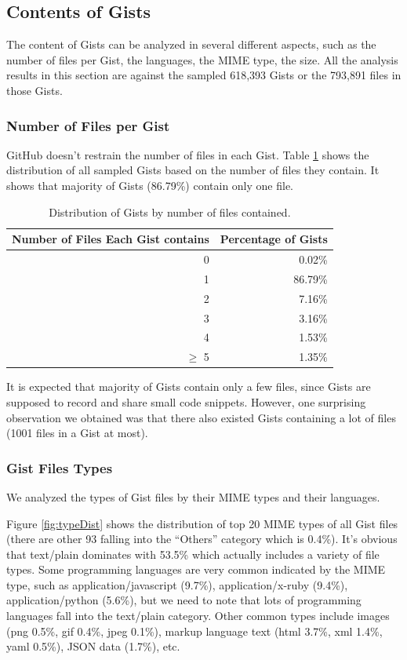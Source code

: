 \subsection{Contents of Gists}
The content of Gists can be analyzed in several different aspects, such as the number of files per Gist, the languages, the MIME type, the size. All the analysis results in this section are against the sampled 618,393 Gists or the 793,891 files in those Gists.

\subsubsection{Number of Files per Gist}

GitHub doesn't restrain the number of files in each Gist. Table \ref{tb:files} shows the distribution of all sampled Gists based on the number of files they contain. It shows that majority of Gists (86.79\%) contain only one file. 

\begin{table}[!htb]
 \begin{center}
 \begin{tabular}{@{}rr} 
    \textbf{Number of Files Each Gist contains}	&	\textbf{Percentage of Gists} \\ \hline
	0	&	0.02\%\\
	1	&	86.79\%\\
	2	&	7.16\%\\
	3	&	3.16\%\\
	4	&	1.53\%\\
	$\geq$ 5	&	1.35\%\\\hline
 \end{tabular}
 \end{center}
 \caption{Distribution of Gists by number of files contained.}
 \label{tb:files}
\end{table}

It is expected that majority of Gists contain only a few files, since Gists are supposed to record and share small code snippets. However, one surprising observation we obtained was that there also existed Gists containing a lot of files (1001 files in a Gist at most). 

\subsubsection{Gist Files Types}
We analyzed the types of Gist files by their MIME types and their languages.

Figure \ref{fig:typeDist} shows the distribution of top 20 MIME types of all Gist files (there are other 93 falling into the ``Others'' category which is 0.4\%). It's obvious that text/plain dominates with 53.5\% which actually includes a variety of file types. Some programming languages are very common indicated by the MIME type, such as application/javascript (9.7\%), application/x-ruby (9.4\%), application/python (5.6\%), but we need to note that lots of programming languages fall into the text/plain category. Other common types include images (png 0.5\%, gif 0.4\%, jpeg 0.1\%), markup language text (html 3.7\%, xml 1.4\%, yaml 0.5\%), JSON data (1.7\%), etc. 

